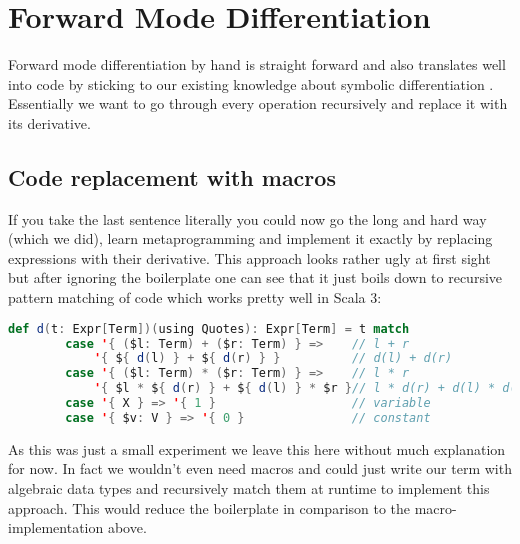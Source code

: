 \section{Forward Mode Differentiation}

Forward mode differentiation by hand is straight forward and also translates well into code by sticking to our existing knowledge about symbolic differentiation . Essentially we want to go through every operation recursively and replace it with its derivative.


\subsection{Code replacement with macros}
If you take the last sentence literally you could now go the long and hard way (which we did), learn metaprogramming and implement it exactly by replacing expressions with their derivative. This approach looks rather ugly at first sight but after ignoring the boilerplate one can see that it just boils down to recursive pattern matching of code which works pretty well in Scala 3:
\begin{lstlisting}[language=scala]
    def d(t: Expr[Term])(using Quotes): Expr[Term] = t match
        case '{ ($l: Term) + ($r: Term) } =>    // l + r
            '{ ${ d(l) } + ${ d(r) } }          // d(l) + d(r)
        case '{ ($l: Term) * ($r: Term) } =>    // l * r
            '{ $l * ${ d(r) } + ${ d(l) } * $r }// l * d(r) + d(l) * d(r)
        case '{ X } => '{ 1 }                   // variable
        case '{ $v: V } => '{ 0 }               // constant
\end{lstlisting}
As this was just a small experiment we leave this here without much explanation for now. In fact we wouldn't even need macros and could just write our term with algebraic data types and recursively match them at runtime to implement this approach. This would reduce the boilerplate in comparison to the macro-implementation above.


